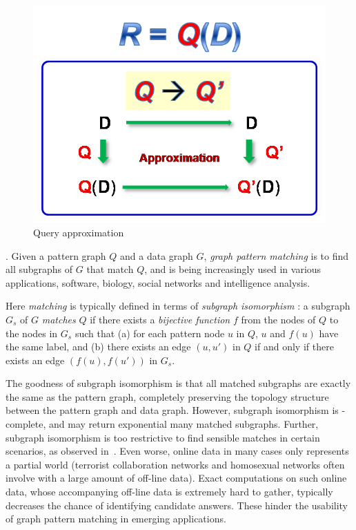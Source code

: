 \begin{figure}[tb!]
  \vspace{-1ex}
  \begin{center}
  \includegraphics[scale=0.5]{./queryApprox.png}
  \end{center}
  \vspace{-3ex}
  \caption{Query approximation}\label{fig-tech-queryappro}
  \vspace{-2ex}
\end{figure}


. Given a pattern graph $Q$ and a data graph $G$,
{\em graph pattern matching} is to find all subgraphs of $G$ that match $Q$, and is being increasingly used in various applications, \eg software, biology, social networks and intelligence analysis.


Here {\em matching} is typically defined in terms of
{\em subgraph isomorphism} \cite{Galla06}:
a subgraph $G_s$ of $G$ {\em matches} $Q$ if
there exists a {\em bijective function} $f$
from the nodes of $Q$ to the nodes in $G_s$ such that (a)  for each
pattern node $u$ in $Q$, $u$ and $f(u)$
have the same label,
and (b) there exists an edge $(u, u')$ in $Q$ if and only
if there exists an edge $(f(u), f(u'))$ in $G_s$.


The goodness of subgraph isomorphism is that all matched subgraphs  are exactly the same as the pattern graph, \ie completely preserving the  topology structure between the pattern graph and data graph. However, subgraph isomorphism is \NP-complete, and may return exponential many matched subgraphs.
Further, subgraph isomorphism is too restrictive to find sensible matches in certain scenarios, as observed in~\cite{FanLMTWW10}. Even worse, online data in many cases only represents a partial world (\eg terrorist collaboration networks and homosexual networks often involve with a large amount of off-line data).
Exact computations on such online data, whose accompanying off-line data is extremely hard to gather, typically decreases the chance of identifying candidate answers.
These hinder the usability of graph pattern matching in emerging applications.


